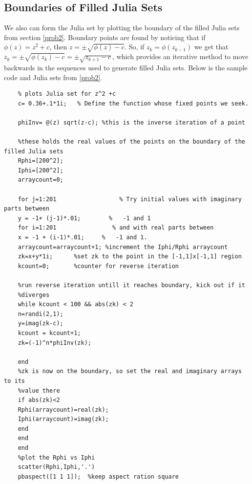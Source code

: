 \documentclass[12pt]{article}
\begin{document}
\subsection{Boundaries of Filled Julia Sets}\label{prob3}
	We also can form the Julia set by plotting the boundary of the filled Julia sets from section \ref{prob2}. Boundary points are found by noticing that if $\phi(z)=z^2+c$, then $z= \pm \sqrt{\phi(z)-c}$. So, if $z_k = \phi(z_{k-1})$ we get that $z_k= \pm \sqrt{\phi(z_k)-c}=\pm \sqrt{z_{k+1}-c}$, which provides an iterative method to move backwards in the sequences used to generate filled Julia sets. Below is the sample code and Julia sets from \ref{prob2}.
	    \begin{verbatim}
	% plots Julia set for z^2 +c
	c= 0.36+.1*1i;   % Define the function whose fixed points we seek.
	
	phiInv= @(z) sqrt(z-c); %this is the inverse iteration of a point
	
	%these holds the real values of the points on the boundary of the filled Julia sets
	Rphi=[200^2];
	Iphi=[200^2];
	arraycount=0;
	
	for j=1:201                  % Try initial values with imaginary parts between
	y = -1+ (j-1)*.01;        %   -1 and 1
	for i=1:201                % and with real parts between
	x = -1 + (i-1)*.01;     %   -1 and 1.
	arraycount=arraycount+1; %increment the Iphi/Rphi arraycount
	zk=x+y*1i;      %set zk to the point in the [-1,1]x[-1,1] region
	kcount=0;       %counter for reverse iteration
	
	%run reverse iteration untill it reaches boundary, kick out if it
	%diverges
	while kcount < 100 && abs(zk) < 2
	n=randi(2,1);
	y=imag(zk-c);
	kcount = kcount+1;
	zk=(-1)^n*phiInv(zk);
	
	end
	%zk is now on the boundary, so set the real and imaginary arrays to its
	%value there
	if abs(zk)<2
	Rphi(arraycount)=real(zk);
	Iphi(arraycount)=imag(zk);
	end
	end
	end
	%plot the Rphi vs Iphi
	scatter(Rphi,Iphi,'.')
	pbaspect([1 1 1]);  %keep aspect ration square
	
	
	\end{verbatim}
	
\end{document}
